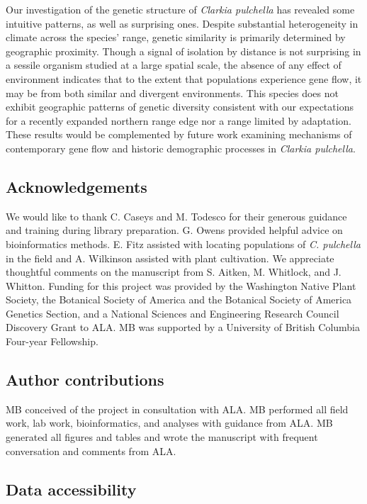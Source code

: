 \documentclass{article}
\begin{document}
Our investigation of the genetic structure of \textit{Clarkia pulchella} has revealed some intuitive patterns, as well as surprising ones. Despite substantial heterogeneity in climate across the species' range, genetic similarity is primarily determined by geographic proximity. Though a signal of isolation by distance is not surprising in a sessile organism studied at a large spatial scale, the absence of any effect of environment indicates that to the extent that populations experience gene flow, it may be from both similar and divergent environments. This species does not exhibit geographic patterns of genetic diversity consistent with our expectations for a recently expanded northern range edge nor a range limited by adaptation. These results would be complemented by future work examining mechanisms of contemporary gene flow and historic demographic processes in \textit{Clarkia pulchella}.


\subsection*{Acknowledgements}

We would like to thank C. Caseys and M. Todesco for their generous guidance and training during library preparation. G. Owens provided helpful advice on bioinformatics methods. E. Fitz assisted with locating populations of \textit{C. pulchella} in the field and A. Wilkinson assisted with plant cultivation. We appreciate thoughtful comments on the manuscript from S. Aitken, M. Whitlock, and J. Whitton. Funding for this project was provided by the Washington Native Plant Society, the Botanical Society of America and the Botanical Society of America Genetics Section, and a National Sciences and Engineering Research Council Discovery Grant to ALA. MB was supported by a University of British Columbia Four-year Fellowship. 

\subsection*{Author contributions}

MB conceived of the project in consultation with ALA. MB performed all field work, lab work, bioinformatics, and analyses with guidance from ALA. MB generated all figures and tables and wrote the manuscript with frequent conversation and comments from ALA. 

\subsection*{Data accessibility}
\end{document}
